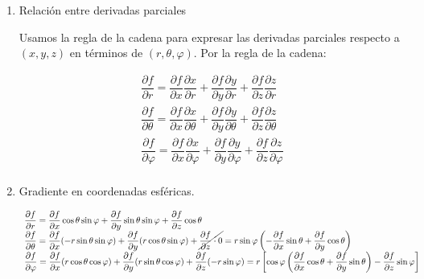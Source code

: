 \begin{enumerate}[label=\color{red}\textbf{\arabic*)}, leftmargin=*]
\begin{enumerate}[label=\arabic*)]
\item Relación entre derivadas parciales

Usamos la regla de la cadena para expresar las derivadas parciales respecto a $(x,y,z)$ en términos de $(r,\theta,\varphi)$. Por la regla de la cadena:

\[
\begin{array}{l}
\dfrac{\partial f}{\partial r}=\dfrac{\partial f}{\partial x}\dfrac{\partial x}{\partial r}+\dfrac{\partial f}{\partial y}\dfrac{\partial y}{\partial r}+\dfrac{\partial f}{\partial z}\dfrac{\partial z}{\partial r}\\

\dfrac{\partial f}{\partial \theta}=\dfrac{\partial f}{\partial x}\dfrac{\partial x}{\partial \theta}+\dfrac{\partial f}{\partial y}\dfrac{\partial y}{\partial \theta}+\dfrac{\partial f}{\partial z}\dfrac{\partial z}{\partial \theta}\\

\dfrac{\partial f}{\partial \varphi}=\dfrac{\partial f}{\partial x}\dfrac{\partial x}{\partial \varphi}+\dfrac{\partial f}{\partial y}\dfrac{\partial y}{\partial \varphi}+\dfrac{\partial f}{\partial z}\dfrac{\partial z}{\partial \varphi}\\
\end{array}
\]
\item Gradiente en coordenadas esféricas.

\[
\begin{array}{l}
\dfrac{\partial f}{\partial r}=\dfrac{\partial f}{\partial x}\cos\theta\sin\varphi+\dfrac{\partial f}{\partial y}\sin\theta\sin\varphi+\dfrac{\partial f}{\partial z}\cos\theta\\

\dfrac{\partial f}{\partial \theta}=\dfrac{\partial f}{\partial x}(-r\sin\theta\sin\varphi)+\dfrac{\partial f}{\partial y}(r\cos\theta\sin\varphi)+\cancel{\dfrac{\partial f}{\partial z}\cdot0}=r\sin\varphi\left(-\dfrac{\partial f}{\partial x}\sin\theta+\dfrac{\partial f}{\partial y}\cos\theta\right)\\

\dfrac{\partial f}{\partial \varphi}=\dfrac{\partial f}{\partial x}(r\cos\theta\cos\varphi)+\dfrac{\partial f}{\partial y}(r\sin\theta\cos\varphi)+\dfrac{\partial f}{\partial z}(-r\sin\varphi)=r\left[\cos\varphi\left(\dfrac{\partial f}{\partial x}\cos\theta+\dfrac{\partial f}{\partial y}\sin\theta\right)-\dfrac{\partial f}{\partial z}\sin\varphi\right]
\end{array}
\]
\end{enumerate}


\end{enumerate}
